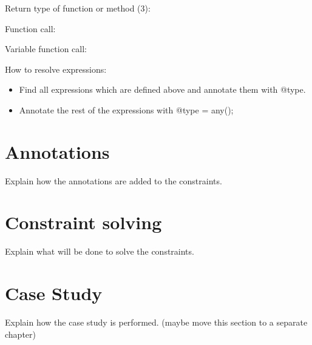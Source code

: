 \documentclass[../main.tex]{subfiles}
\begin{document}
    Return type of function or method (3):    
    \begin{prooftree}
    \end{prooftree}    
    
    \hrulefill
        
    Function call:
    \begin{prooftree}
    \end{prooftree}    
    
    \hrulefill
    
    Variable function call:
    \begin{prooftree}
    \end{prooftree}    
    
    \hrulefill
    
    How to resolve expressions:
    \begin{itemize}
        \item Find all expressions which are defined above and annotate them with @type.
        \item Annotate the rest of the expressions with @type = any();
    \end{itemize}
    
    \section{Annotations}
    Explain how the annotations are added to the constraints.
    \Blindtext
    
    \section{Constraint solving}
    Explain what will be done to solve the constraints.
    \\
    \Blindtext
    
    \section{Case Study}
    Explain how the case study is performed. (maybe move this section to a separate chapter)
    \\
    \Blindtext
\end{document}
